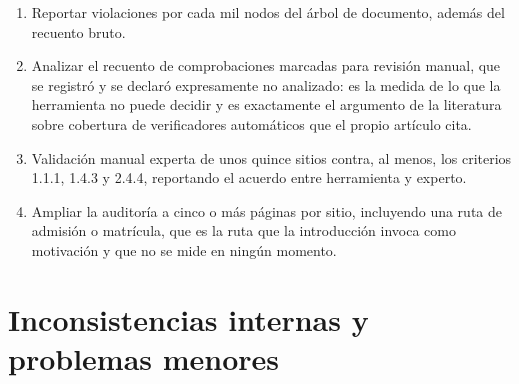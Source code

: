 \documentclass[11pt,a4paper]{article}
\begin{document}
\begin{enumerate}
	\item Reportar violaciones por cada mil nodos del \'arbol de documento, adem\'as del recuento bruto.
	\item Analizar el recuento de comprobaciones marcadas para revisi\'on manual, que se registr\'o y se declar\'o expresamente no analizado: es la medida de lo que la herramienta no puede decidir y es exactamente el argumento de la literatura sobre cobertura de verificadores autom\'aticos que el propio art\'iculo cita.
	\item Validaci\'on manual experta de unos quince sitios contra, al menos, los criterios 1.1.1, 1.4.3 y 2.4.4, reportando el acuerdo entre herramienta y experto.
	\item Ampliar la auditor\'ia a cinco o m\'as p\'aginas por sitio, incluyendo una ruta de admisi\'on o matr\'icula, que es la ruta que la introducci\'on invoca como motivaci\'on y que no se mide en ning\'un momento.
\end{enumerate}

\section{Inconsistencias internas y problemas menores}
\end{document}
